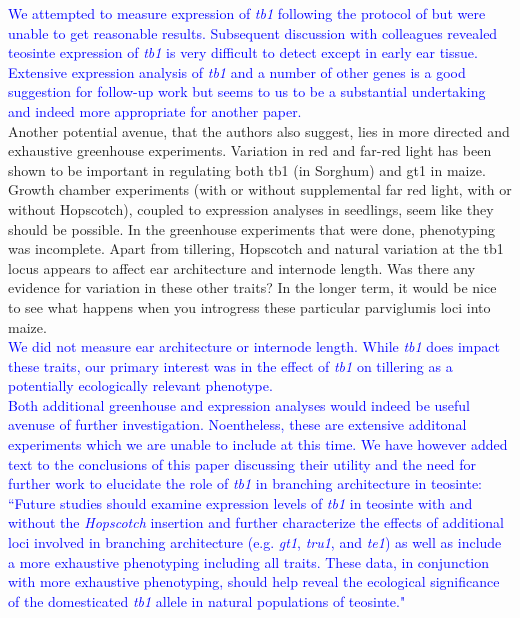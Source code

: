 \documentclass[11pt]{article}
\newcommand{\res}[1]{\noindent \textcolor{blue}{{#1}} \\}
\begin{document}
\res{We attempted to measure expression of \emph{tb1} following the protocol of \citep{hubbard2002expression} but were unable to get reasonable results. Subsequent discussion with colleagues revealed teosinte expression of \emph{tb1} is very difficult to detect except in early ear tissue. Extensive expression analysis of \emph{tb1} and a number of other genes is a good suggestion for follow-up work but seems to us to be a substantial undertaking and indeed more appropriate for another paper. }

Another potential avenue, that the authors also suggest, lies in more directed and exhaustive greenhouse experiments. Variation in red and far-red light has been shown to be important in regulating both tb1 (in Sorghum) and gt1 in maize. Growth chamber experiments (with or without supplemental far red light, with or without Hopscotch), coupled to expression analyses in seedlings, seem like they should be possible.  In the greenhouse experiments that were done, phenotyping was incomplete. Apart from tillering, Hopscotch and natural variation at the tb1 locus appears to affect ear architecture and internode length. Was there any evidence for variation in these other traits? In the longer term, it would be nice to see what happens when you introgress these particular parviglumis loci into maize.\\ 

\res{We did not measure ear architecture or internode length. While \emph{tb1} does impact these traits, our primary interest was in the effect of  \emph{tb1} on tillering as a potentially ecologically relevant phenotype.}

\res{Both additional greenhouse and expression analyses would indeed be useful avenuse of further investigation.  Noentheless, these are extensive additonal experiments which we are unable to include at this time. We have however added text to the conclusions of this paper discussing their utility and the need for further work to elucidate the role of \emph{tb1} in branching architecture in teosinte: ``Future studies should examine expression levels of \emph{tb1} in teosinte with and without the \emph{Hopscotch} insertion and further characterize the effects of additional loci involved in branching architecture (e.g. \emph{gt1}, \emph{tru1}, and \emph{te1}) as well as include a more exhaustive phenotyping including all traits.  These data, in conjunction with more exhaustive phenotyping, should help reveal the ecological significance of the domesticated \emph{tb1} allele in natural populations of teosinte."}
\end{document}

